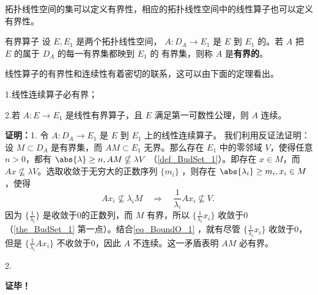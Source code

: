 
\begin{issues}
\issueDraft
\end{issues}

拓扑线性空间的集可以定义有界性，相应的拓扑线性空间中的线性算子也可以定义有界性。

\begin{definition}{有界算子}
设 $E,E_1$ 是两个拓扑线性空间， $A:D_A\rightarrow E_1$ 是 $E$ 到 $E_1$ 的。若 $A$ 把 $E$ 的属于 $D_A$ 的每一有界集都映到 $E_1$ 的 有界集，则称 $A$ 是\textbf{有界的}。
\end{definition}

线性算子的有界性和连续性有着密切的联系，这可以由下面的定理看出。

\begin{theorem}{}
1.线性连续算子必有界；

2.若 $A:E\rightarrow E_1$ 是线性有界算子，且 $E$ 满足第一可数性公理，则 $A$ 连续。
\end{theorem}
\textbf{证明：}1. 令 $A:D_A\rightarrow E_1$ 是 $E$ 到 $E_1$ 上的线性连续算子。 我们利用反证法证明：设 $M\subset D_A$ 是有界集，而 $AM\subset E_1$ 无界。那么存在 $E_1$ 中的零邻域 $V$，使得任意 $n>0$，都有 $\abs{\lambda}\geq n,AM\nsubseteq\lambda V$ （\autoref{def_BudSet_1}）。即存在 $x\in M$，而 $Ax\nsubseteq \lambda V$。选取收敛于无穷大的正数序列 $\{m_i\}$ ，则存在 $\abs{\lambda_i}\geq m_i,x_i\in M$，使得 
\begin{equation}\label{eq_BoundO_1}
Ax_i\nsubseteq \lambda_iM\quad\Rightarrow\quad \frac{1}{\lambda_i}A x_i\nsubseteq V. ~
\end{equation}
因为 $\{\frac{1}{\lambda_i}\}$ 是收敛于0的正数列，而 $M$ 有界，所以 $\{\frac{1}{\lambda_i}x_i\}$ 收敛于0（\autoref{the_BudSet_1} 第一点）。结合\autoref{eq_BoundO_1} ，就有尽管 $\{\frac{1}{\lambda_i}x_i\}$ 收敛于0，但是 $\{\frac{1}{\lambda_i}A x_i\}$ 不收敛于0，因此 $A$ 不连续。这一矛盾表明 $AM$ 必有界。

2.

\textbf{证毕！}


